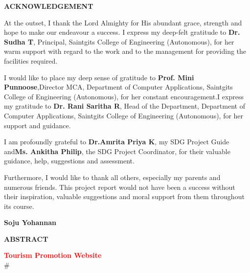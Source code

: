 \documentclass[12pt,a4paper]{report}
\begin{document}
\newpage
\thispagestyle{empty}

\begin{center}
\fontsize{16pt}{18pt}\selectfont
\textbf{ACKNOWLEDGEMENT}
\end{center}

\vspace{1cm}

At the outset, I thank the Lord Almighty for His abundant grace, strength and hope to make our
endeavour a success. I express my deep-felt gratitude to \textbf{Dr. Sudha T}, Principal, Saintgits
College of Engineering (Autonomous), for her warm support with regard to the work and to the
management for providing the facilities required.

I would like to place my deep sense of gratitude to \textbf{Prof. Mini Punnoose},\linebreak Director
MCA, Department of Computer Applications, Saintgits College of Engineering (Autonomous), for her
constant encouragement.I express my gratitude to \linebreak\textbf{Dr. Rani Saritha R}, Head of the
Department, Department of Computer Applications, Saintgits College of Engineering (Autonomous),
for her support and guidance.

I am profoundly grateful to \textbf{Dr.Amrita Priya K}, my SDG Project Guide and\linebreak\textbf{Ms.
Ankitha Philip}, the SDG Project Coordinator, for their valuable guidance, help, suggestions and
assessment.

Furthermore, I would like to thank all others, especially my parents and numerous friends. This
project report would not have been a success without their inspiration, valuable suggestions and
moral support from them throughout its course.

\vspace{2cm}

\begin{flushright}
\textbf{Soju Yohannan}
\end{flushright}

\newpage
\thispagestyle{empty}

\begin{center}
\fontsize{16pt}{18pt}\selectfont
\textbf{ABSTRACT}
\end{center}

\vspace{1cm}
\textcolor{red}{\textbf{Tourism Promotion Website }}\\
#
\end{document}
